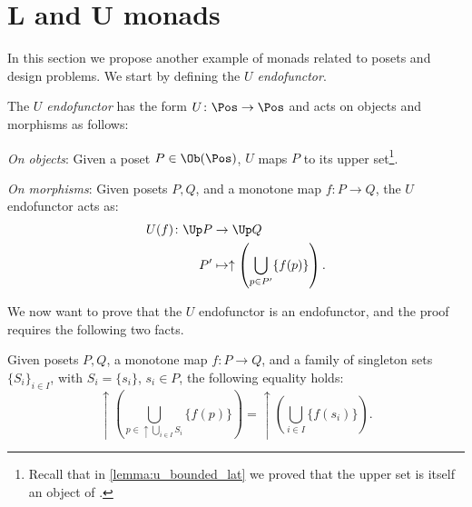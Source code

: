 \section{L and U monads}
In this section we propose another example of monads related to posets and design problems. We start by defining the \emph{$U$ endofunctor}.
\begin{definition}[$U$ endofunctor]
\label{def:ufunctor}
The \emph{$U$ endofunctor} has the form $U\colon \Pos \to \Pos$ and acts on objects and morphisms as follows:
\begin{compactenum}
    \item \emph{On objects}: Given a poset $P\in \Ob(\Pos)$, $U$ maps $P$ to its upper set\footnote{Recall that in \cref{lemma:u_bounded_lat} we proved that the upper set is itself an object of \Pos.}.
    \item \emph{On morphisms}: Given posets $P,Q$, and a monotone map $f\colon P\to Q$, the $U$ endofunctor acts as:
    \begin{equation}
        \begin{aligned}
            U(f)\colon \Up P&\to \Up Q\\
            P'&\mapsto \uparrow \left( \bigcup_{p\in P'} \{f(p)\}\right).
        \end{aligned}
    \end{equation}
\end{compactenum}
\end{definition}
We now want to prove that the $U$ endofunctor is an endofunctor, and the proof requires the following two facts.
\begin{lemma}
\label{lemma:unpack_u_functor}
Given posets $P,Q$, a monotone map $f\colon P \to Q$, and a family of singleton sets $\{S_i\}_{i\in I}$, with $S_i=\{s_i\}$, $s_i\in P$, the following equality holds:
\begin{equation}
\label{eq:lemma_unpack}
    \uparrow\left( \bigcup_{p\in \uparrow \bigcup_{i\in I}S_i}\{f(p)\}\right)= \uparrow \left( \bigcup_{i\in I} \{f(s_i)\}\right).
\end{equation}
\end{lemma}
